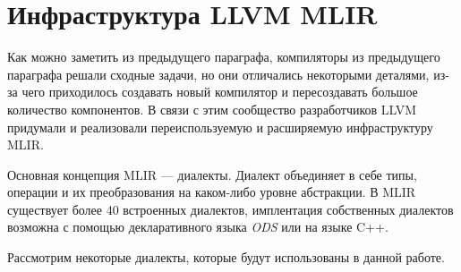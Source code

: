 \section{Инфраструктура LLVM MLIR}
\label{sec:Chapter5} 

Как можно заметить из предыдущего параграфа, компиляторы из предыдущего параграфа
решали сходные задачи, но они отличались некоторыми деталями, из-за чего
приходилось создавать новый компилятор и пересоздавать большое количество
компонентов. В связи с этим сообщество разработчиков LLVM придумали и реализовали
переиспользуемую и расширяемую инфраструктуру MLIR.

Основная концепция MLIR --- диалекты. Диалект объединяет в себе типы, операции
и их преобразования на каком-либо уровне абстракции. В MLIR существует более 40
встроенных диалектов, имплентация собственных диалектов возможна с помощью
декларативного языка \textit{ODS} или на языке C++.

Рассмотрим некоторые диалекты, которые будут использованы в данной работе.

